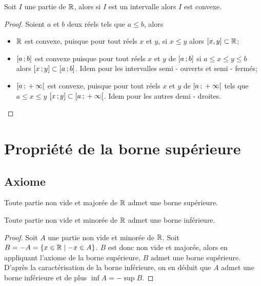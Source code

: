 \begin{theo}
  \label{theo:partieconvexe1}
  Soit \(I\) une partie de \(\mathbb{R}\), alors si \(I\) est un intervalle alors \(I\)
  est convexe.
\end{theo}
\begin{proof}
  Soient \(a\) et \(b\) deux réels tels que \(a\leqslant b\), alors
  \begin{itemize}
    \item \(\mathbb{R}\) est convexe, puisque pour tout réels \(x\) et \(y\), si
      \(x\leqslant y\) alors \([x, y]\subset \mathbb{R}\);
    \item \(\left[ a \, ; {} b \right]\) est convexe puisque pour tout réels \(x\) et
      \(y\) de \(\left[ a \, ; {} b \right]\) si \(a\leqslant x\leqslant y\leqslant b\)
      alors \(\left[ x \, ; {} y \right]\subset \left[ a \, ; {} b \right]\). Idem pour les
      intervalles semi - ouverts et semi - fermés;
    \item \(\left[ a \, ; {}  + \infty \right[\) est convexe, puisque pour tout réels
      \(x\) et \(y\) de \(\left[ a \, ; {}  + \infty \right[\) tels que \(a\leqslant
      x\leqslant y\) \(\left[ x \, ; {} y \right]\subset \left[ a \, ; {}  + \infty \right[\).
      Idem pour les autres demi - droites.
  \end{itemize}
\end{proof}

\section{Propriété de la borne supérieure}

\subsection{Axiome}

\begin{theo}
  \label{theo:bornesup}
  Toute partie non vide et majorée de \(\mathbb{R}\) admet une borne supérieure.
\end{theo}
\begin{theo}
  Toute partie non vide et minorée de \(\mathbb{R}\) admet une borne inférieure.
\end{theo}
\begin{proof}
  Soit \(A\) une partie non vide et minorée de \(\mathbb{R}\). Soit \(B = -A =
  \left\{x\in \mathbb{R}\mathrel{}\middle|\mathrel{} - x \in A\right\}\). \(B\) est donc non vide et majorée, alors en
  appliquant l'axiome de la borne supérieure, \(B\) admet une borne supérieure.
  D'après la caractérisation de la borne inférieure, on en déduit que \(A\)
  admet une borne inférieure et de plus \(\inf A = -\sup B\).
\end{proof}

